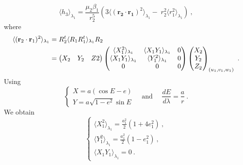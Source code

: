\documentclass[a4paper]{article}
\begin{document}
\section{}
\label{averaging}
\subsection{}
\label{averagingH2}
\begin{equation}
 \langle h_{3} \rangle _{\lambda_{1}}=\frac{\mu_{2}\beta_{1}}{r_{2}^{5}}(3 \langle (\mathbf{r_{2} \cdot r_{1}})^{2} \rangle _{\lambda_{1}} - \; r_{2}^{2} \langle r_{1}^{2} \rangle _{\lambda_{1}}) \ ,
\end{equation}
where
\begin{align}
 \langle (\mathbf r_{2} \cdot \mathbf r_{1})^{2} \rangle _{\lambda_{1}} &= R_{2}^{t} \langle  R_{1} R_{1}^{t} \rangle _{\lambda_{1}}R_{2} \notag \\
&=
\begin{pmatrix}
X_{2} & Y_{2} & Z{2}
\end{pmatrix}
\begin{pmatrix}
 \langle X_{1}^{2} \rangle _{\lambda_{1}} &  \langle X_{1}Y_ {1} \rangle _{\lambda_{1}} & 0 \\
 \langle X_{1}Y_ {1} \rangle _{\lambda_{1}} &  \langle Y_{1}^{2} \rangle _{\lambda_{1}} & 0 \\
0 & 0 & 0 
\end{pmatrix}
\begin{pmatrix}
X_{2} \\
Y_{2} \\
Z_{2}
\end{pmatrix}
_{(u_{1},v_{1},w_{1})} \ .
\label{matrix}
\end{align}
Using
\begin{equation}
\begin{cases}
X=a(\cos{E} -e) \\
Y=a\sqrt{1-e^{2}}\sin{E}
\end{cases}  
\quad
\text{and }
\quad
\frac{dE}{d\lambda}=\frac{a}{r} \ .
\end{equation}
We obtain
\begin{equation}
\begin{cases}
 \langle X_{1}^{2} \rangle _{\lambda_{1}}=\frac{a_{1}^{2}}{2}(1+4e_{1}^{2}) \ , \\
 \langle Y_{1}^{2} \rangle _{\lambda_{1}}=\frac{a_{1}^{2}}{2}(1-e_{1}^{2}) \ , \\
 \langle X_{1}Y_ {1} \rangle _{\lambda_{1}}=0 \ .
\end{cases}
\end{equation}
\end{document}
